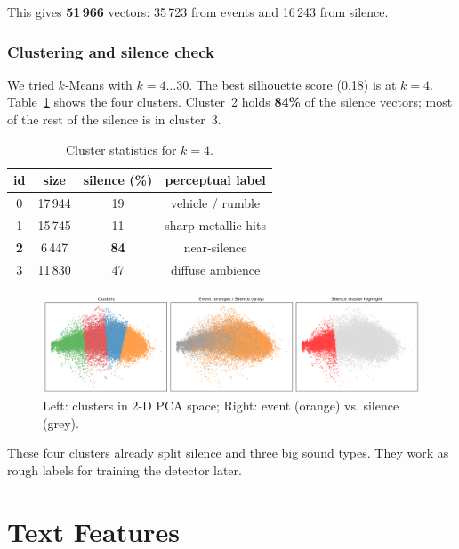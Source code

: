 \documentclass{article}
\begin{document}
This gives \textbf{51\,966} vectors: 35\,723 from events and 16\,243 from silence.

\subsubsection{Clustering and silence check}
We tried $k$‑Means with $k=4\ldots30$. The best silhouette score (0.18) is at $k=4$. Table~\ref{tab:cluster} shows the four clusters. Cluster~2 holds \textbf{84\%} of the silence vectors; most of the rest of the silence is in cluster~3.

\begin{table}[h]
    \caption{Cluster statistics for $k=4$.}
    \label{tab:cluster}
    \centering
    \begin{tabular}{cccc}
        \toprule
        id & size & silence (\%) & perceptual label \\ \midrule
        0 & 17\,944 & 19 & vehicle / rumble \\
        1 & 15\,745 & 11 & sharp metallic hits \\
        \textbf{2} & 6\,447 & \textbf{84} & near‑silence \\
        3 & 11\,830 & 47 & diffuse ambience \\ \bottomrule
    \end{tabular}
\end{table}

\begin{figure}[h]
    \centering
    \includegraphics[width=.45\linewidth]{figs_tang/03_pca_clusters.png}
    \caption{Left: clusters in 2‑D PCA space; Right: event (orange) vs. silence (grey).}
    \label{fig:pca_scatter}
\end{figure}

These four clusters already split silence and three big sound types. They work as rough labels for training the detector later.



\section{Text Features}
\end{document}
